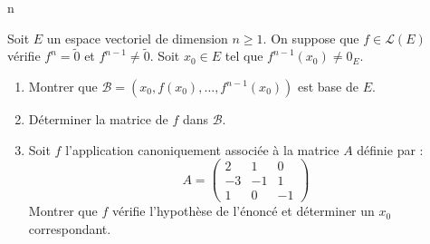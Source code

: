 n\documentclass[a4paper,10pt]{report}
\begin{document}
\begin{Exercice}{} Soit $E$ un espace vectoriel de dimension $n \geq 1$. On suppose que $f \in \mathcal{L}(E)$ vérifie $f^n = \tilde{0}$ et $f^{n-1} \neq \tilde{0}$. Soit $x_0 \in E$ tel que $f^{n-1}(x_0) \neq 0_E$.

\begin{enumerate}
\item Montrer que $\mathcal{B}= (x_0, f(x_0), \ldots, f^{n-1}(x_0))$ est base de $E$. 
\item Déterminer la matrice de $f$ dans $\mathcal{B}$.
\item Soit $f$ l'application canoniquement associée à la matrice $A$ définie par :
$$ A = \begin{pmatrix}
2 & 1 & 0 \\
-3 & -1 & 1 \\
1 & 0 & -1 
\end{pmatrix}$$
Montrer que $f$ vérifie l'hypothèse de l'énoncé et déterminer un $x_0$ correspondant.
\end{enumerate}
\end{Exercice}

\corr 
\end{document}
